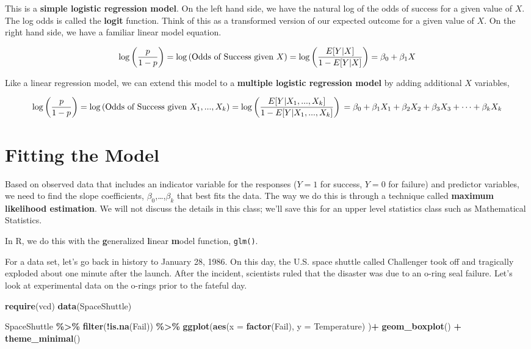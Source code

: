 \documentclass[
]{book}
\newenvironment{Shaded}{\begin{snugshade}}{\end{snugshade}}
\newcommand{\AttributeTok}[1]{\textcolor[rgb]{0.13,0.29,0.53}{#1}}
\newcommand{\FunctionTok}[1]{\textcolor[rgb]{0.13,0.29,0.53}{\textbf{#1}}}
\newcommand{\NormalTok}[1]{#1}
\newcommand{\SpecialCharTok}[1]{\textcolor[rgb]{0.81,0.36,0.00}{\textbf{#1}}}
\begin{document}
This is a \textbf{simple logistic regression model}. On the left hand side, we have the natural log of the odds of success for a given value of \(X\). The log odds is called the \textbf{logit} function. Think of this as a transformed version of our expected outcome for a given value of \(X\). On the right hand side, we have a familiar linear model equation.

\[\log\left(\frac{p}{1-p}\right) =\log\left(\hbox{Odds of Success given } X\right) = \log\left(\frac{E[Y|X]}{1-E[Y|X]}\right) = \beta_0 +\beta_1X\]

Like a linear regression model, we can extend this model to a \textbf{multiple logistic regression model} by adding additional \(X\) variables,

\[\log\left(\frac{p}{1-p}\right) =\log\left(\hbox{Odds of Success given } X_1,...,X_k\right)= \log\left(\frac{E[Y|X_1,...,X_k]}{1-E[Y|X_1,...,X_k]}\right) \\ = \beta_0 +\beta_1X_1+\beta_2X_2+\beta_3X_3+\cdots +\beta_kX_k\]

\section{Fitting the Model}\label{fitting-the-model}

Based on observed data that includes an indicator variable for the responses (\(Y=1\) for success, \(Y=0\) for failure) and predictor variables, we need to find the slope coefficients, \(\beta_0\),\ldots,\(\beta_k\) that best fits the data. The way we do this is through a technique called \textbf{maximum likelihood estimation}. We will not discuss the details in this class; we'll save this for an upper level statistics class such as Mathematical Statistics.

In R, we do this with the \textbf{g}eneralized \textbf{l}inear \textbf{m}odel function, \texttt{glm()}.

For a data set, let's go back in history to January 28, 1986. On this day, the U.S. space shuttle called Challenger took off and tragically exploded about one minute after the launch. After the incident, scientists ruled that the disaster was due to an o-ring seal failure. Let's look at experimental data on the o-rings prior to the fateful day.

\begin{Shaded}
\begin{Highlighting}[]
\FunctionTok{require}\NormalTok{(vcd)}
\FunctionTok{data}\NormalTok{(SpaceShuttle)}

\NormalTok{SpaceShuttle }\SpecialCharTok{\%\textgreater{}\%}
  \FunctionTok{filter}\NormalTok{(}\SpecialCharTok{!}\FunctionTok{is.na}\NormalTok{(Fail)) }\SpecialCharTok{\%\textgreater{}\%}
  \FunctionTok{ggplot}\NormalTok{(}\FunctionTok{aes}\NormalTok{(}\AttributeTok{x =} \FunctionTok{factor}\NormalTok{(Fail), }\AttributeTok{y =}\NormalTok{ Temperature) )}\SpecialCharTok{+} 
  \FunctionTok{geom\_boxplot}\NormalTok{() }\SpecialCharTok{+}
  \FunctionTok{theme\_minimal}\NormalTok{()}
\end{Highlighting}
\end{Shaded}
\end{document}
